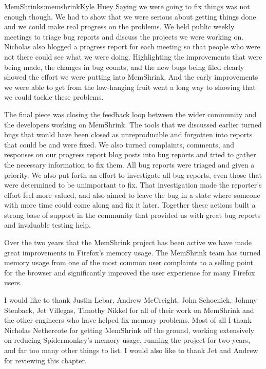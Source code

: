 \begin{aosachapter}{MemShrink}{s:memshrink}{Kyle Huey}
Saying we were going to fix things was not enough though. We had to show
that we were serious about getting things done and we could make real
progress on the problems. We held public weekly meetings to triage bug
reports and discuss the projects we were working on. Nicholas also
blogged a progress report for each meeting so that people who were not
there could see what we were doing. Highlighting the improvements that
were being made, the changes in bug counts, and the new bugs being filed
clearly showed the effort we were putting into MemShrink. And the early
improvements we were able to get from the low-hanging fruit went a long
way to showing that we could tackle these problems.

The final piece was closing the feedback loop between the wider
community and the developers working on MemShrink. The tools that we
discussed earlier turned bugs that would have been closed as
unreproducible and forgotten into reports that could be and were fixed.
We also turned complaints, comments, and responses on our progress
report blog posts into bug reports and tried to gather the necessary
information to fix them. All bug reports were triaged and given a
priority. We also put forth an effort to investigate all bug reports,
even those that were determined to be unimportant to fix. That
investigation made the reporter's effort feel more valued, and also
aimed to leave the bug in a state where someone with more time could
come along and fix it later. Together these actions built a strong base
of support in the community that provided us with great bug reports and
invaluable testing help.


Over the two years that the MemShrink project has been active we have
made great improvements in Firefox's memory usage. The MemShrink team
has turned memory usage from one of the most common user complaints to a
selling point for the browser and significantly improved the user
experience for many Firefox users.

I would like to thank Justin Lebar, Andrew McCreight, John Schoenick,
Johnny Stenback, Jet Villegas, Timothy Nikkel for all of their work on
MemShrink and the other engineers who have helped fix memory problems.
Most of all I thank Nicholas Nethercote for getting MemShrink off the
ground, working extensively on reducing Spidermonkey's memory usage,
running the project for two years, and far too many other things to
list. I would also like to thank Jet and Andrew for reviewing this
chapter.

\end{aosachapter}
